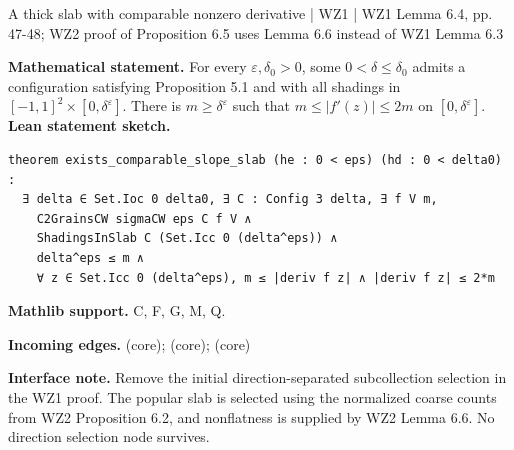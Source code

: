 \documentclass[10pt,a4paper]{article}
\newcommand{\nodecard}[1]{\hyperlink{node-#1}{\texttt{\detokenize{#1}}}}
\begin{document}
\begin{minipage}{\linewidth}
\hypertarget{node-L6_4}{}
\begin{tcolorbox}[colback=white,colframe=slopefg,colbacktitle=slopebg,coltitle=ink,boxrule=0.45pt,arc=1.6mm,left=3mm,right=3mm,top=2mm,bottom=2mm,title={\sffamily\bfseries WZ1 Lemma 6.4 / CW \hfill \texttt{L6\_4}}]
{\sffamily\small\color{muted}A thick slab with comparable nonzero derivative | WZ1 | WZ1 Lemma 6.4, pp. 47-48; WZ2 proof of Proposition 6.5 uses Lemma 6.6 instead of WZ1 Lemma 6.3}\par
\textbf{Mathematical statement.} For every $\varepsilon,\delta_0>0$, some $0<\delta\le\delta_0$ admits a configuration satisfying Proposition 5.1 and with all shadings in $[-1,1]^2\times[0,\delta^\varepsilon]$.
There is $m\ge\delta^\varepsilon$ such that $m\le|f'(z)|\le2m$ on $[0,\delta^\varepsilon]$.
\smallskip\textbf{Lean statement sketch.}
\begin{Verbatim}[fontsize=\small,breaklines=true,breakanywhere=true,tabsize=2]
theorem exists_comparable_slope_slab (he : 0 < eps) (hd : 0 < delta0) :
  ∃ delta ∈ Set.Ioc 0 delta0, ∃ C : Config 3 delta, ∃ f V m,
    C2GrainsCW sigmaCW eps C f V ∧
    ShadingsInSlab C (Set.Icc 0 (delta^eps)) ∧
    delta^eps ≤ m ∧
    ∀ z ∈ Set.Icc 0 (delta^eps), m ≤ |deriv f z| ∧ |deriv f z| ≤ 2*m
\end{Verbatim}
{\footnotesize\textbf{Mathlib support.} C, F, G, M, Q.\par
\textbf{Incoming edges.} \nodecard{W2P6_4} (core); \nodecard{W2P6_2} (core); \nodecard{W2L6_6} (core)\par}
{\footnotesize\textbf{Interface note.} Remove the initial direction-separated subcollection selection in the WZ1 proof. The popular slab is selected using the normalized coarse counts from WZ2 Proposition 6.2, and nonflatness is supplied by WZ2 Lemma 6.6. No direction selection node survives.}
\end{tcolorbox}\end{minipage}\par\medskip
\end{document}
